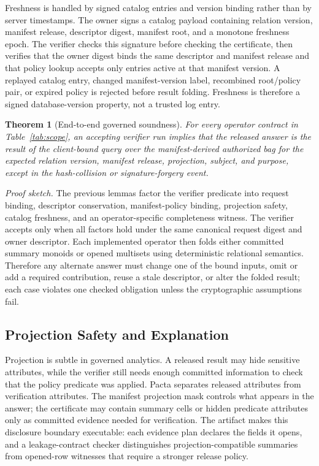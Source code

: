 \documentclass[conference]{IEEEtran}
\newcommand{\sys}{Pacta\xspace}
\newtheorem{theorem}{Theorem}
\begin{document}
Freshness is handled by signed catalog entries and version binding rather than by server timestamps. The owner signs a catalog payload containing relation version, manifest release, descriptor digest, manifest root, and a monotone freshness epoch. The verifier checks this signature before checking the certificate, then verifies that the owner digest binds the same descriptor and manifest release and that policy lookup accepts only entries active at that manifest version. A replayed catalog entry, changed manifest-version label, recombined root/policy pair, or expired policy is rejected before result folding. Freshness is therefore a signed database-version property, not a trusted log entry.

\begin{theorem}[End-to-end governed soundness]
For every operator contract in Table~\ref{tab:scope}, an accepting verifier run implies that the released answer is the result of the client-bound query over the manifest-derived authorized bag for the expected relation version, manifest release, projection, subject, and purpose, except in the hash-collision or signature-forgery event.
\end{theorem}

\noindent\emph{Proof sketch.} The previous lemmas factor the verifier predicate into request binding, descriptor conservation, manifest-policy binding, projection safety, catalog freshness, and an operator-specific completeness witness. The verifier accepts only when all factors hold under the same canonical request digest and owner descriptor. Each implemented operator then folds either committed summary monoids or opened multisets using deterministic relational semantics. Therefore any alternate answer must change one of the bound inputs, omit or add a required contribution, reuse a stale descriptor, or alter the folded result; each case violates one checked obligation unless the cryptographic assumptions fail.

\subsection{Projection Safety and Explanation}
Projection is subtle in governed analytics. A released result may hide sensitive attributes, while the verifier still needs enough committed information to check that the policy predicate was applied. \sys separates released attributes from verification attributes. The manifest projection mask controls what appears in the answer; the certificate may contain summary cells or hidden predicate attributes only as committed evidence needed for verification. The artifact makes this disclosure boundary executable: each evidence plan declares the fields it opens, and a leakage-contract checker distinguishes projection-compatible summaries from opened-row witnesses that require a stronger release policy.
\end{document}
